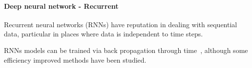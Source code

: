 \paragraph{Deep neural network - Recurrent}
Recurrent neural networks (RNNs) have  reputation in dealing with sequential data, particular in places where data is independent to time steps. 


RNNs models can be trained via back propagation through time~\cite{Goodfellow-et-al-2016}, although some efficiency improved methods have been studied.~\cite{963769,neco.1989,Gomez:2008:ANE:1390681.1390712}